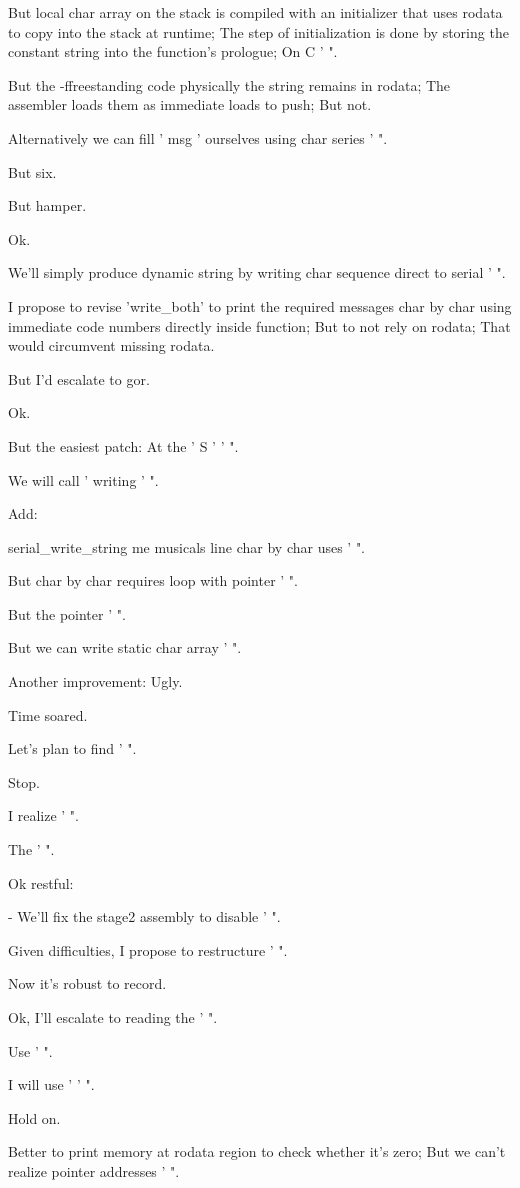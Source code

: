 \begin{decodedreasoningpanel}
But local char array on the stack is compiled with an initializer that uses rodata to copy into the stack at runtime; The step of initialization is done by storing the constant string into the function's prologue; On C ' ".

But the -ffreestanding code physically the string remains in rodata; The assembler loads them as immediate loads to push; But not.

Alternatively we can fill ' msg ' ourselves using char series ' ".

But six.

But hamper.

Ok.

We'll simply produce dynamic string by writing char sequence direct to serial ' ".

I propose to revise 'write\_both' to print the required messages char by char using immediate code numbers directly inside function; But to not rely on rodata; That would circumvent missing rodata.

But I'd escalate to gor.

Ok.

But the easiest patch: At the ' S ' ' ".

We will call ' writing ' ".

Add:

serial\_write\_string me musicals line char by char uses ' ".

But char by char requires loop with pointer ' ".

But the pointer ' ".

But we can write static char array ' ".

Another improvement: Ugly.

Time soared.

Let's plan to find ' ".

Stop.

I realize ' ".

The ' ".

Ok restful:

- We'll fix the stage2 assembly to disable ' ".

Given difficulties, I propose to restructure ' ".

Now it's robust to record.

Ok, I'll escalate to reading the ' ".

Use ' ".

I will use ' ' ".

Hold on.

Better to print memory at rodata region to check whether it's zero; But we can't realize pointer addresses ' ".


\end{decodedreasoningpanel}
